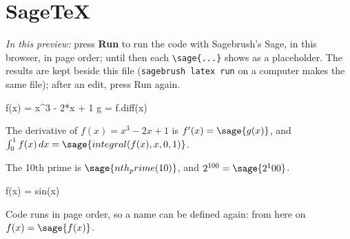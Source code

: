 \documentclass{article}
\begin{document}
\section*{SageTeX}

\emph{In this preview:} press \textbf{Run} to run the code with Sagebrush's Sage, in this browser, in page
order; until then each \texttt{\textbackslash sage\{...\}} shows as a placeholder. The results are kept beside
this file (\texttt{sagebrush latex run} on a computer makes the same file); after an edit, press Run again.

\begin{sagesilent}
f(x) = x^3 - 2*x + 1
g = f.diff(x)
\end{sagesilent}

The derivative of $f(x) = x^3 - 2x + 1$ is $f'(x) = \sage{g(x)}$, and
$\int_0^1 f(x)\,dx = \sage{integral(f(x), x, 0, 1)}$.

The 10th prime is $\sage{nth_prime(10)}$, and $2^{100} = \sage{2^100}$.

\begin{sagesilent}
f(x) = sin(x)
\end{sagesilent}

Code runs in page order, so a name can be defined again: from here on $f(x) = \sage{f(x)}$.

\end{document}
